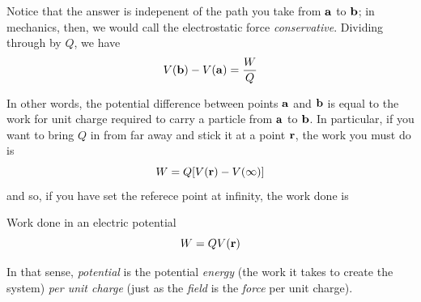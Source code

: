 		Notice that the answer is indepenent of the path you take from $\vb a$ to $\vb b$;
		in mechanics, then, we would call the electrostatic force \textit{conservative}. Dividing
		through by $Q$, we have
		\begin{equation}
		    V( \vb{b} ) - V( \vb{a} )
			=
			\frac{W}{Q} 
		\end{equation}

		In other words, the potential difference between points $\vb a$ and $\vb b$ is equal
		to the work for unit charge required to carry a particle from $\vb a$ to $\vb b$. In
		particular, if you want to bring $Q$ in from far away and stick it at a point $\vb r$,
		the work you must do is
		\[
			W = Q\bqty{
				V( \vb{r} ) - V(\infty)
			}
		\]
		and so, if you have set the referece point at infinity, the work done is
		\begin{theorem}{Work done in an electric potential}
			\begin{equation}
				\label{eq:workcharge}
				W = QV( \vb{r} )
			\end{equation}
		\end{theorem}

		In that sense, \textit{potential} is the potential \textit{energy} (the work it takes
		to create the system) \textit{per unit charge} (just as the \textit{field} is the
		\textit{force} per unit charge).
